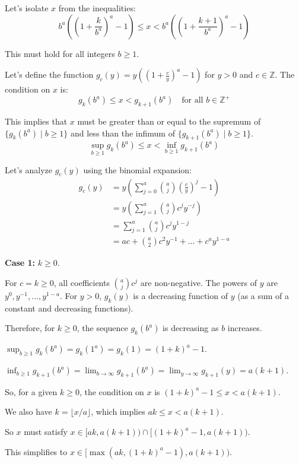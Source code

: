 \documentclass[12pt,a4paper]{article}
\theoremstyle{definition}
\begin{document}
    Let's isolate $x$ from the inequalities:
    \[ b^a\left(\left(1+\frac{k}{b^a}\right)^a - 1\right) \le x < b^a\left(\left(1+\frac{k+1}{b^a}\right)^a - 1\right) \]

    This must hold for all integers $b \ge 1$.

    Let's define the function $g_c(y) = y\left(\left(1+\frac{c}{y}\right)^a - 1\right)$ for $y>0$ and $c \in \mathbb{Z}$. The condition on $x$ is:
    \[ g_k(b^a) \le x < g_{k+1}(b^a) \quad \text{for all } b \in \mathbb{Z}^+ \]

    This implies that $x$ must be greater than or equal to the supremum of $\{g_k(b^a) \mid b \ge 1\}$ and less than the infimum of $\{g_{k+1}(b^a) \mid b \ge 1\}$.
    \[ \sup_{b\ge 1} g_k(b^a) \le x < \inf_{b\ge 1} g_{k+1}(b^a) \]

    Let's analyze $g_c(y)$ using the binomial expansion:
    \begin{align}
        g_c(y) &= y \left( \sum_{j=0}^a \binom{a}{j} \left(\frac{c}{y}\right)^j - 1 \right) \\
        &= y \left( \sum_{j=1}^a \binom{a}{j} c^j y^{-j} \right) \\
        &= \sum_{j=1}^a \binom{a}{j} c^j y^{1-j} \\
        &= ac + \binom{a}{2}c^2 y^{-1} + \dots + c^a y^{1-a}
    \end{align}

    \textbf{Case 1:} $k \ge 0$.

    For $c=k \ge 0$, all coefficients $\binom{a}{j}c^j$ are non-negative. The powers of $y$ are $y^0, y^{-1}, \dots, y^{1-a}$. For $y>0$, $g_k(y)$ is a decreasing function of $y$ (as a sum of a constant and decreasing functions).

    Therefore, for $k \ge 0$, the sequence $g_k(b^a)$ is decreasing as $b$ increases.

    $\sup_{b\ge 1} g_k(b^a) = g_k(1^a) = g_k(1) = (1+k)^a-1$.

    $\inf_{b\ge 1} g_{k+1}(b^a) = \lim_{b\to\infty} g_{k+1}(b^a) = \lim_{y\to\infty} g_{k+1}(y) = a(k+1)$.

    So, for a given $k \ge 0$, the condition on $x$ is $(1+k)^a-1 \le x < a(k+1)$.

    We also have $k = \lfloor x/a \rfloor$, which implies $ak \le x < a(k+1)$.

    So $x$ must satisfy $x \in [ak, a(k+1)) \cap [(1+k)^a-1, a(k+1))$.

    This simplifies to $x \in [\max(ak, (1+k)^a-1), a(k+1))$.
\end{document}
